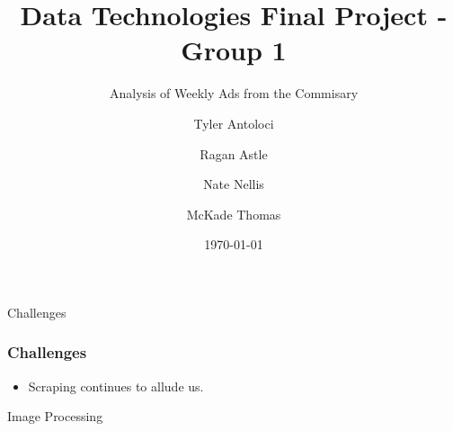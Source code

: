 \documentclass{beamer}
\title{Data Technologies Final Project - Group 1}
\subtitle{Analysis of Weekly Ads from the Commisary}
\author{Tyler Antoloci \and Ragan Astle \newline \and Nate Nellis \and McKade Thomas}
\institute{Utah State University}
\date{\today}
\begin{document}
\begin{frame}
    \titlepage
\end{frame}

\begin{frame}{Challenges}
    \frametitle{Challenges}
    \begin{itemize}
        \item Scraping continues to allude us.  
    \end{itemize} 
\end{frame}

\begin{frame}{Image Processing}

\end{frame}
    
\end{document}
